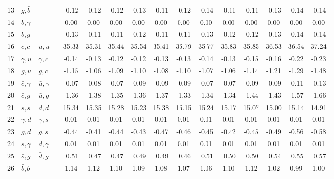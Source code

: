 \begin{tabularx}{\textwidth}{rXXX@{}S@{}S@{}S@{}S@{}S@{}S@{}S@{}S@{}S@{}S@{}S@{}S}
 13 & $g,\bar b$       &                  &                 & -0.12 & -0.12 & -0.12 & -0.13 & -0.11 & -0.12 & -0.14 & -0.11 & -0.11 & -0.13 & -0.14 & -0.14 \\
 14 & $b,\gamma$       &                  &                 &  0.00 &  0.00 &  0.00 &  0.00 &  0.00 &  0.00 &  0.00 &  0.00 &  0.00 &  0.00 &  0.00 &  0.00 \\
 15 & $b,g$            &                  &                 & -0.13 & -0.11 & -0.11 & -0.12 & -0.11 & -0.11 & -0.13 & -0.12 & -0.12 & -0.13 & -0.14 & -0.14 \\
 16 & $\bar c,c$       & $\bar u,u$       &                 & 35.33 & 35.31 & 35.44 & 35.54 & 35.41 & 35.79 & 35.77 & 35.83 & 35.85 & 36.53 & 36.54 & 37.24 \\
 17 & $\gamma, u$      & $\gamma, c$      &                 & -0.14 & -0.13 & -0.12 & -0.12 & -0.13 & -0.13 & -0.14 & -0.13 & -0.15 & -0.16 & -0.22 & -0.23 \\
 18 & $g,u$            & $g,c$            &                 & -1.15 & -1.06 & -1.09 & -1.10 & -1.08 & -1.10 & -1.07 & -1.06 & -1.14 & -1.21 & -1.29 & -1.48 \\
 19 & $\bar c,\gamma$  & $\bar u,\gamma$  &                 & -0.07 & -0.08 & -0.07 & -0.09 & -0.09 & -0.09 & -0.07 & -0.07 & -0.09 & -0.09 & -0.11 & -0.13 \\
 20 & $\bar c, g$      & $\bar u, g$      &                 & -1.36 & -1.38 & -1.35 & -1.36 & -1.37 & -1.33 & -1.34 & -1.34 & -1.44 & -1.43 & -1.57 & -1.66 \\
 21 & $\bar s, s$      & $\bar d, d$      &                 & 15.34 & 15.35 & 15.28 & 15.23 & 15.38 & 15.15 & 15.24 & 15.17 & 15.07 & 15.00 & 15.14 & 14.91 \\
 22 & $\gamma, d$      & $\gamma, s$      &                 &  0.01 &  0.01 &  0.01 &  0.01 &  0.01 &  0.01 &  0.01 &  0.01 &  0.01 &  0.01 &  0.01 &  0.01 \\
 23 & $g,d$            & $g,s$            &                 & -0.44 & -0.41 & -0.44 & -0.43 & -0.47 & -0.46 & -0.45 & -0.42 & -0.45 & -0.49 & -0.56 & -0.58 \\
 24 & $\bar s,\gamma$  & $\bar d,\gamma$  &                 &  0.01 &  0.01 &  0.01 &  0.01 &  0.01 &  0.01 &  0.01 &  0.01 &  0.01 &  0.01 &  0.01 &  0.01 \\
 25 & $\bar s,g$       & $\bar d, g$      &                 & -0.51 & -0.47 & -0.47 & -0.49 & -0.49 & -0.46 & -0.51 & -0.50 & -0.50 & -0.54 & -0.55 & -0.57 \\
 26 & $\bar b,b$       &                  &                 &  1.14 &  1.12 &  1.10 &  1.09 &  1.08 &  1.07 &  1.06 &  1.10 &  1.12 &  1.02 &  0.99 &  1.00 \\

\end{tabularx}
